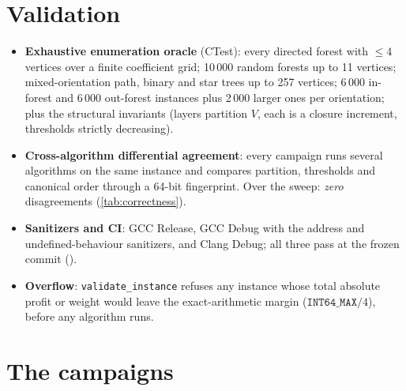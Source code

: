 \documentclass[11pt]{article}
\newcommand{\tab}[1]{}
\begin{document}
\section{Validation}\label{sec:validation}

\begin{itemize}
  \item \textbf{Exhaustive enumeration oracle} (CTest): every directed forest
  with $\le4$ vertices over a finite coefficient grid; 10\,000 random forests
  up to 11 vertices; mixed-orientation path, binary and star trees up to 257
  vertices; 6\,000 in-forest and 6\,000 out-forest instances plus 2\,000
  larger ones per orientation; plus the structural invariants (layers
  partition $V$, each is a closure increment, thresholds strictly decreasing).
  \item \textbf{Cross-algorithm differential agreement}: every campaign runs
  several algorithms on the same instance and compares partition, thresholds
  and canonical order through a 64-bit fingerprint. Over the sweep:
  \emph{zero} disagreements (\cref{tab:correctness}).
  \item \textbf{Sanitizers and CI}: GCC Release, GCC Debug with the address
  and undefined-behaviour sanitizers, and Clang Debug; all three pass at the
  frozen commit ().
  \item \textbf{Overflow}: \texttt{validate\_instance} refuses any instance
  whose total absolute profit or weight would leave the exact-arithmetic
  margin ($\texttt{INT64\_MAX}/4$), before any algorithm runs.
\end{itemize}

\begin{table}[htbp]
\centering
\caption{Number of instances benchmarked, of timed runs, and of
cross-algorithm disagreements, per instance class. Every group aggregates all
sizes, densities, coefficient families and seeds of that class. The
\texttt{FPHPF} comparison is listed apart, \texttt{FPHPF} being an external
baseline rather than one of our algorithms. Zero disagreements everywhere: on
each instance the algorithms returned the same partition, the same thresholds and
the same canonical order.}
\label{tab:correctness}
\small
\tab{rep_correctness}
\end{table}

\section{The campaigns}\label{sec:campaigns}
\end{document}
